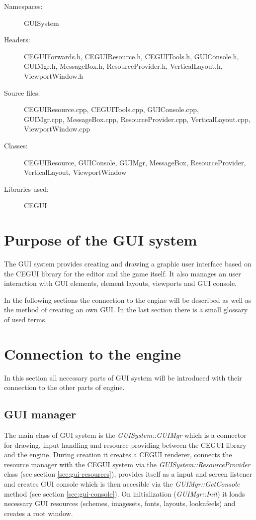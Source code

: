 \begin{description}
  \item[Namespaces:] GUISystem
  \item[Headers:] CEGUIForwards.h, CEGUIResource.h, CEGUITools.h, GUIConsole.h, GUIMgr.h, MessageBox.h, ResourceProvider.h, VerticalLayout\-.h, ViewportWindow.h
  \item[Source files:] CEGUIResource.cpp, CEGUITools.cpp, GUIConsole.cpp, \\GUIMgr.cpp, MessageBox.cpp, ResourceProvider.cpp, VerticalLayout\-.cpp, ViewportWindow.cpp
  \item[Classes:] CEGUIResource, GUIConsole, GUIMgr, MessageBox, ResourceProvider, VerticalLayout, ViewportWindow
  \item[Libraries used:] CEGUI
\end{description}

\section{Purpose of the GUI system}

The GUI system provides creating and drawing a graphic user interface based on the CEGUI library for the editor and the game itself. It also manages an user interaction with GUI elements, element layouts, viewports and GUI console.

In the following sections the connection to the engine will be described as well as the method of creating an own GUI. In the last section there is a small glossary of used terms.

\section{Connection to the engine}

In this section all necessary parts of GUI system will be introduced with their connection to the other parts of engine.

\subsection{GUI manager}

The main class of GUI system is the \emph{GUISystem::GUIMgr} which is a connector for drawing, input handling and resource providing between the CEGUI library and the engine. During creation it creates a CEGUI renderer, connects the resource manager with the CEGUI system via the \emph{GUISystem::Resource\-Provider} class (see section \ref{sec:gui-resources}), provides itself as a input and screen listener and creates GUI console which is then accesible via the \emph{GUIMgr::GetConsole} method (see section \ref{sec:gui-console}). On initialization (\emph{GUIMgr::Init}) it loads necessary GUI resources (schemes, imagesets, fonts, layouts, looknfeels) and creates a root window.

